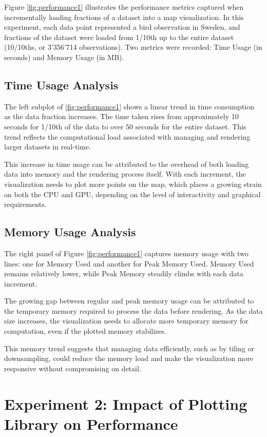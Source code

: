 Figure \ref{fig:performance1} illustrates the performance metrics captured when incrementally loading fractions of a dataset into a map visualization. In this experiment, each data point represented a bird observation in Sweden, and fractions of the dataset were loaded from 1/10th up to the entire dataset (10/10ths, or 3'356'714 observations). Two metrics were recorded: Time Usage (in seconds) and Memory Usage (in MB).

\subsection{Time Usage Analysis}

The left subplot of \ref{fig:performance1} shows a linear trend in time consumption as the data fraction increases. The time taken rises from approximately 10 seconds for 1/10th of the data to over 50 seconds for the entire dataset. This trend reflects the computational load associated with managing and rendering larger datasets in real-time.

This increase in time usage can be attributed to the overhead of both loading data into memory and the rendering process itself. With each increment, the visualization needs to plot more points on the map, which places a growing strain on both the CPU and GPU, depending on the level of interactivity and graphical requirements.

\subsection{Memory Usage Analysis}

The right panel of Figure \ref{fig:performance1} captures memory usage with two lines: one for Memory Used and another for Peak Memory Used. Memory Used remains relatively lower, while Peak Memory steadily climbs with each data increment.

The growing gap between regular and peak memory usage can be attributed to the temporary memory required to process the data before rendering. As the data size increases, the visualization needs to allocate more temporary memory for computation, even if the plotted memory stabilizes.

This memory trend suggests that managing data efficiently, such as by tiling or downsampling, could reduce the memory load and make the visualization more responsive without compromising on detail.

\section{Experiment 2: Impact of Plotting Library on Performance}

